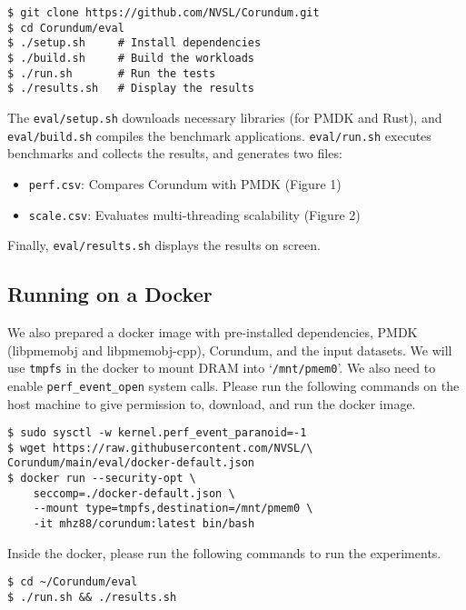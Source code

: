 {\begin{verbatim}
$ git clone https://github.com/NVSL/Corundum.git
$ cd Corundum/eval
$ ./setup.sh     # Install dependencies
$ ./build.sh     # Build the workloads
$ ./run.sh       # Run the tests
$ ./results.sh   # Display the results
\end{verbatim}

The \verb+eval/setup.sh+ downloads necessary libraries (for PMDK and Rust), and \verb+eval/build.sh+ compiles the benchmark applications.
\verb+eval/run.sh+ executes benchmarks and collects the results, and generates two files:

\begin{itemize}
  \item \verb+perf.csv+: Compares Corundum with PMDK (Figure 1)
  \item \verb+scale.csv+: Evaluates multi-threading scalability (Figure 2)
\end{itemize}

\noindent Finally, \verb+eval/results.sh+ displays the results on screen.


\subsection{Running on a Docker}

We also prepared a docker image with pre-installed dependencies, PMDK (libpmemobj and libpmemobj-cpp), Corundum, and the input datasets. We will use \verb+tmpfs+ in the docker to mount DRAM into `\verb+/mnt/pmem0+'. We also need to enable \verb+perf_event_open+ system calls. Please run the following commands on the host machine to give permission to, download, and run the docker image.


\begin{verbatim}
$ sudo sysctl -w kernel.perf_event_paranoid=-1
$ wget https://raw.githubusercontent.com/NVSL/\
Corundum/main/eval/docker-default.json
$ docker run --security-opt \
    seccomp=./docker-default.json \
    --mount type=tmpfs,destination=/mnt/pmem0 \
    -it mhz88/corundum:latest bin/bash
\end{verbatim}

\noindent
Inside the docker, please run the following commands to run the experiments.

\begin{verbatim}
$ cd ~/Corundum/eval
$ ./run.sh && ./results.sh
\end{verbatim}

}
